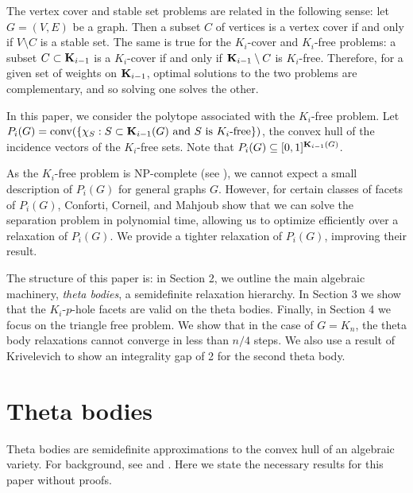 The vertex cover and stable set problems are related in the following sense: let $G = (V,E)$ be a graph. Then a subset $C$ of vertices is a vertex cover if and only if $V \setminus C$ is a stable set. The same is true for the $K_i$-cover and $K_i$-free problems: a subset $C \subset \mathbf{K}_{i-1}$ is a $K_i$-cover if and only if $\mathbf{K}_{i-1} \setminus C$ is $K_i$-free. Therefore, for a given set of weights on $\mathbf{K}_{i-1}$, optimal solutions to the two problems are complementary, and so solving one solves the other.

In this paper, we consider the polytope associated with the $K_i$-free problem. Let 
$P_i(G) = \hbox{conv}(\{\chi_S: S \subset \mathbf{K}_{i-1}(G) \text{ and $S$ is $K_i$-free}\})$, 
the convex hull of the incidence vectors of the $K_i$-free sets. Note that $P_i(G) \subseteq [0,1]^{\mathbf{K}_{i-1}(G)}$.

As the $K_i$-free problem is NP-complete (see \cite{conforti}), we cannot expect a small description of $P_i(G)$ for general graphs $G$. However, for certain classes of facets of $P_i(G)$, Conforti, Corneil, and Mahjoub \cite{conforti} show that we can solve the separation problem in polynomial time, allowing us to optimize efficiently over a relaxation of $P_i(G)$. We provide a tighter relaxation of $P_i(G)$, improving their result.

The structure of this paper is: in Section 2, we outline the main algebraic
machinery, {\em theta bodies}, a semidefinite relaxation hierarchy. In Section 3
we show that the $K_i$-$p$-hole facets are valid on the theta bodies. Finally,
in Section 4 we focus on the triangle free problem. We show that in the case of
$G = K_n$, the theta body relaxations cannot converge in less than $n/4$ steps.
We also use a result of Krivelevich \cite{krivelevich}  to show an integrality gap of 2 for the second theta body.

\section{Theta bodies}
Theta bodies are semidefinite approximations to the convex hull of an algebraic variety. For background, see \cite{frg} and \cite{gpt}. Here we state the necessary results for this paper without proofs.

